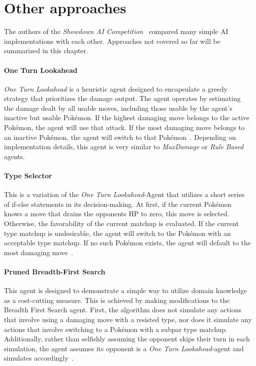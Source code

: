 \section{Other approaches}
The authors of the \textit{Showdown AI Competition}~\autocite{Lee_Togelius_2017} compared many
simple AI implementations with each other. Approaches not covered so far will be summarized
in this chapter.


\paragraph{One Turn Lookahead}
\emph{One Turn Lookahead} is a heuristic agent designed to encapsulate a greedy strategy that 
prioritizes the damage output. The agent operates by estimating the damage dealt by all usable moves, 
including those usable by the agent's inactive but usable Pokémon. If the highest damaging move 
belongs to the active Pokémon, the agent will use that attack. If the most damaging move belongs to 
an inactive Pokémon, the agent will switch to that Pokémon~\autocite{Lee_Togelius_2017}. Depending 
on implementation details, this agent is very similar to \emph{MaxDamage} or \emph{Rule Based}
agents.

\paragraph{Type Selector}
This is a variation of the \textit{One Turn Lookahead}-Agent that utilizes a short series of
if-else statements in its decision-making. At first, if the current Pokémon knows a move 
that drains the opponents \ac{HP} to zero, this move is selected. Otherwise, the 
favorability of the current matchup is evaluated. If the current type matchup is 
undesirable, the agent will switch to the Pokémon with an acceptable type matchup. If no
such Pokémon exists, the agent will default to the most damaging move~\autocite{Lee_Togelius_2017}.

\paragraph{Pruned Breadth-First Search}
This agent is designed to demonstrate a simple way to utilize domain knowledge as a cost-cutting 
measure. This is achieved by making modifications to the Breadth First Search agent. First, 
the algorithm does not simulate any actions that involve using a damaging move with a resisted type, 
nor does it simulate any actions that involve switching to a Pokémon with a subpar type matchup. 
Additionally, rather than selfishly assuming the opponent skips their turn in each simulation, the 
agent assumes its opponent is a \emph{One Turn Lookahead}-agent and simulates 
accordingly~\autocite{Lee_Togelius_2017}.

